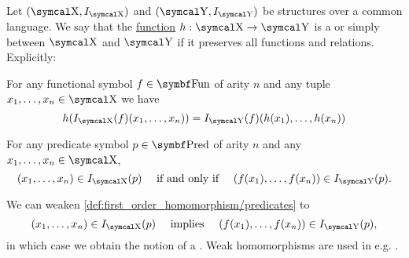\begin{definition}\label{def:first_order_homomorphism}
  Let \( (\CX, I_{\CX}) \) and \( (\CY, I_{\CY}) \) be structures over a common language. We say that the \hyperref[def:function]{function} \( h: \CX \to \CY \) is a  or simply  between \( \CX \) and \( \CY \) if it preserves all functions and relations. Explicitly:
  \begin{DefEnum}
     For any functional symbol \( f \in \Bold{Fun} \) of arity \( n \) and any tuple \( x_1, \ldots, x_n \in \CX \) we have
    \begin{equation}\label{eq:def:first_order_homomorphism/functions}
      h(I_{\CX}(f)(x_1, \ldots, x_n)) = I_{\CY}(f)(h(x_1), \ldots, h(x_n))
    \end{equation}

     For any predicate symbol \( p \in \Bold{Pred} \) of arity \( n \) and any \( x_1, \ldots, x_n \in \CX \),
    \begin{equation}\label{eq:def:first_order_homomorphism/predicates}
      (x_1, \ldots, x_n) \in I_{\CX}(p) \quad\T{if and only if}\quad (f(x_1), \ldots, f(x_n)) \in I_{\CY}(p).
    \end{equation}

     We can weaken \ref{def:first_order_homomorphism/predicates} to
    \begin{equation}\label{eq:def:first_order_homomorphism/predicates_weak}
      (x_1, \ldots, x_n) \in I_{\CX}(p) \quad\T{implies}\quad (f(x_1), \ldots, f(x_n)) \in I_{\CY}(p),
    \end{equation}
    in which case we obtain the notion of a . Weak homomorphisms are used in e.g. .
  \end{DefEnum}
\end{definition}


